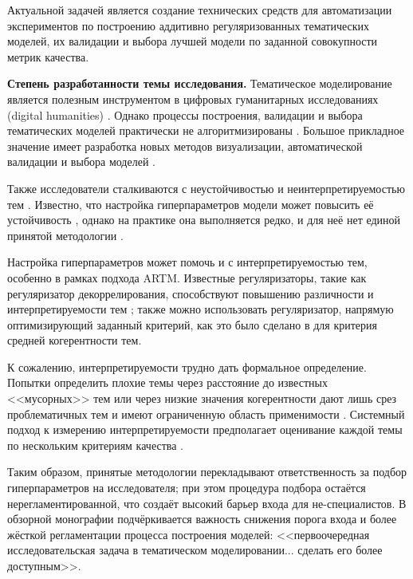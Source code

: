 Актуальной задачей является создание технических средств для автоматизации экспериментов по построению аддитивно регуляризованных тематических моделей, их валидации и выбора лучшей модели по заданной совокупности метрик качества. 

\textbf{Степень разработанности темы исследования.}
Тематическое моделирование является полезным инструментом в цифровых гуманитарных исследованиях (digital humanities) \cite{grimmer2013text,paakkonen2020humanistic}. Однако процессы построения, валидации и выбора тематических моделей практически не алгоритмизированы \cite{paakkonen2020humanistic}. Большое прикладное значение имеет разработка новых методов визуализации, автоматической валидации и выбора моделей \cite{dh_sea}.

Также исследователи сталкиваются с неустойчивостью \cite{mantyla2018measuring} и неинтерпретируемостью тем \cite{boydcare}. Известно, что настройка гиперпараметров модели может повысить её устойчивость \cite{agrawal2018wrong}, однако на практике она выполняется редко, и для неё нет единой принятой методологии  \cite{agrawal2018wrong,chen2016survey}.

Настройка гиперпараметров может помочь и с интерпретируемостью тем, особенно в рамках подхода ARTM. Известные регуляризаторы, такие как регуляризатор декоррелирования, способствуют повышению различности и интерпретируемости тем \cite{popov_hier}; также можно использовать  регуляризатор, напрямую оптимизирующий заданный критерий, как это было сделано в \cite{4keys} для критерия средней когерентности тем.

К сожалению, интерпретируемости трудно дать формальное определение. Попытки определить плохие темы через расстояние до известных <<мусорных>> тем или через низкие значения когерентности дают лишь срез проблематичных тем и имеют ограниченную область применимости \cite{boydcare}. Системный подход к измерению интерпретируемости предполагает оценивание каждой темы по нескольким критериям качества \cite{fan2019assessing}.

Таким образом, принятые методологии перекладывают ответственность за подбор гиперпараметров на исследователя; при этом процедура подбора остаётся нерегламентированной, что создаёт высокий барьер входа для не-специалистов. 
В обзорной монографии \cite{fntir2017applications} подчёркивается важность снижения порога входа и более жёсткой регламентации процесса построения моделей: <<первоочередная исследовательская задача в тематическом моделировании... сделать его более доступным>>.

